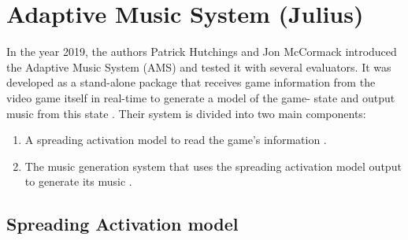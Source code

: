 \section{Adaptive Music System (Julius)}

In the year 2019, the authors Patrick Hutchings and Jon McCormack
introduced the Adaptive Music System (AMS) \cite{hutMcCormAms} 
and tested it with several evaluators. It was developed as a
stand-alone package that receives game information from the
video game itself in real-time to generate a model of the game-
state and output music from this state \cite{hutMcCormAms}. Their
system is divided into two main components: 
\begin{enumerate}[label=\arabic*)]
    \item A spreading activation model to read the game's information \cite{hutMcCormAms}.
    \item The music generation system that uses the spreading activation model output to generate its music \cite{hutMcCormAms}. 
\end{enumerate}

\subsection{Spreading Activation model}


